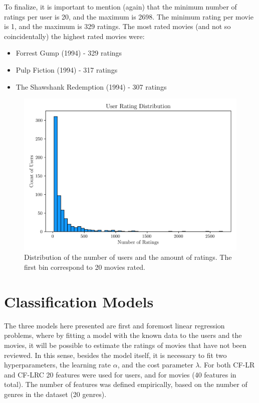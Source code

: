 \documentclass[conference]{IEEEtran}
\begin{document}
To finalize, it is important to mention (again) that the minimum number of ratings per user is 20, and the maximum is 2698. The minimum rating per movie is 1, and the maximum is 329 ratings. The most rated movies (and not so coincidentally) the highest rated movies were:
\begin{itemize}
    \item Forrest Gump (1994) - 329 ratings
    \item Pulp Fiction (1994) - 317 ratings
    \item The Shawshank Redemption (1994) - 307 ratings
\end{itemize}


\begin{figure}[H]
    \centering
    \includegraphics[width=1\linewidth]{assets/distribution_userratings.png}
    \caption{Distribution of the number of users and the amount of ratings. The first bin correspond to 20 movies rated.}    \label{fig:distribution_userratings}
\end{figure}

\section{Classification Models}

The three models here presented are first and foremost linear regression problems, where by fitting a model with the known data to the users and the movies, it will be possible to estimate the ratings of movies that have not been reviewed. In this sense, besides the model itself, it is necessary to fit two hyperparameters, the learning rate $\alpha$, and the cost parameter $\lambda$. For both CF-LR and CF-LRC 20 features were used for users, and for movies (40 features in total). The number of features was defined empirically, based on the number of genres in the dataset (20 genres).
\end{document}
